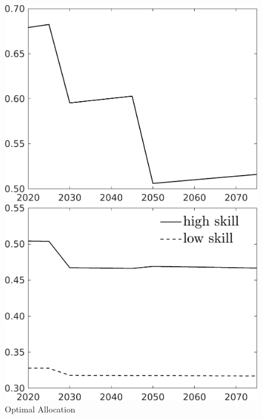\begin{figure}[h!!]
	\centering
	\caption{Optimal Allocation }\label{fig:optAll}
	
	
	\begin{minipage}[]{0.32\textwidth}
		\includegraphics[width=1\textwidth]{../../codding_model/own_basedOnFried/optimalPol_190722_tidiedUp/figures/all_July22/C_SingleAltPolOPT_T_NoTaus_regime3_spillover0_noskill0_sep1_xgrowth0_etaa0.79.png}
	\end{minipage}
	\begin{minipage}[]{0.32\textwidth}
		\includegraphics[width=1\textwidth]{../../codding_model/own_basedOnFried/optimalPol_190722_tidiedUp/figures/all_July22/SingleJointTOT_regime3_OPT_T_NoTaus_Labour_spillover0_noskill0_sep1_xgrowth0_extern0_etaa0.79_lgd1.png}

\end{minipage}
\end{figure}
